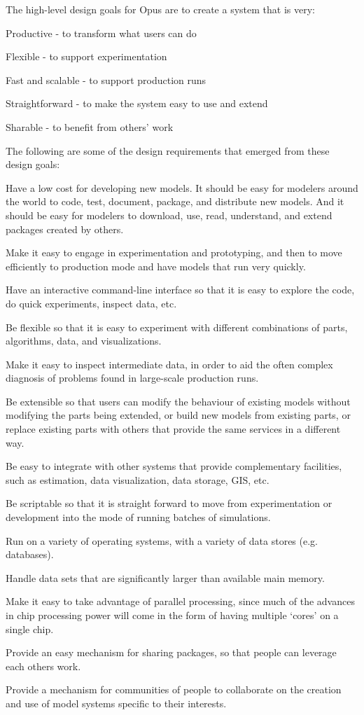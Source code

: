 The high-level design goals for Opus are to create a system that is very:

\squishlist
\item Productive - to transform what users can do
\item Flexible - to support experimentation
\item	Fast and scalable - to support production runs
\item	Straightforward - to make the system easy to use and extend
\item	Sharable - to benefit from others' work
\squishend

The following are some of the design requirements that emerged from these design goals:
\squishlist
\item	Have a low cost for developing new models.  It should be easy for modelers around the world to code, test, document, package, and distribute new models.  And it should be easy for modelers to download, use, read, understand, and extend packages created by others.
\item	Make it easy to engage in experimentation and prototyping, and then to move efficiently to production mode and have models that run very quickly.  
\item	Have an interactive command-line interface so that it is easy to explore the code, do quick experiments, inspect data, etc.
\item	Be flexible so that it is easy to experiment with different combinations of parts, algorithms, data, and visualizations.
\item	Make it easy to inspect intermediate data, in order to aid the often complex diagnosis of problems found in large-scale production runs.
\item	Be extensible so that users can modify the behaviour of existing models without modifying the parts being extended, or build new models from existing parts, or replace existing parts with others that provide the same services in a different way.
\item	Be easy to integrate with other systems that provide complementary facilities, such as estimation, data visualization, data storage, GIS, etc.
\item	Be scriptable so that it is straight forward to move from experimentation or development into the mode of running batches of simulations.
\item	Run on a variety of operating systems, with a variety of data stores (e.g. databases).
\item	Handle data sets that are significantly larger than available main memory.
\item	Make it easy to take advantage of parallel processing, since much of the advances in chip processing power will come in the form of having multiple `cores' on a single chip.
\item	Provide an easy mechanism for sharing packages, so that people can leverage each others work.
\item	Provide a mechanism for communities of people to collaborate on the creation and use of model systems specific to their interests.
\squishend

